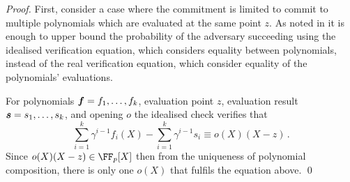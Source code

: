 \documentclass[runningheads,11pt]{llncs}
\let\spvec\vec
\let\vec\accentvec
\let\vec\spvec
\def\vec#1{\mathchoice{\mbox{\boldmath$\displaystyle#1$}}
	{\mbox{\boldmath$\textstyle#1$}}
	{\mbox{\boldmath$\scriptstyle#1$}}
	{\mbox{\boldmath$\scriptscriptstyle#1$}}}
\newtheorem{corollary}[theorem]{Corollary}
\theoremstyle{definition}
\begin{document}
\begin{proof}
	First, consider a case where the commitment is limited to commit to multiple polynomials which are evaluated at the same point $z$. 
	As noted in \cite[Lemma 2.2]{EPRINT:GabWilCio19} it is enough to upper bound
  the probability of the adversary succeeding using the idealised verification equation, which considers equality between polynomials, instead of the real verification equation, which consider equality of the polynomials' evaluations.
	
	For polynomials $\vec{f} = f_1, \ldots, f_k$, evaluation point $z$, evaluation result $\vec{s} = s_1, \ldots, s_k$, and opening $o$ the idealised check verifies that
	\begin{equation}
		\sum_{i = 1}^k \gamma^{i - 1} f_i(X) - \sum_{i = 1}^{k} \gamma^{i - 1} s_i \equiv o(X) (X - z)\,.
		\label{eq:pcom_idealised_check}
	\end{equation}
	Since $o(X)(X - z) \in \FF_p[X]$ then from the uniqueness of polynomial composition, there is only one $o(X)$ that fulfils the equation above.
	\qed
\end{proof}
\end{document}
